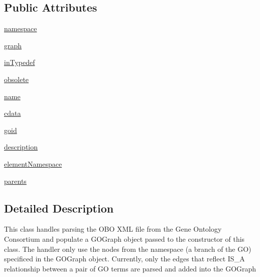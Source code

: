 \subsection*{Public Attributes}
\begin{DoxyCompactItemize}
\item 
\hyperlink{class_g_o_obo_xml_handler_1_1_g_o_obo_xml_handler_aecef11101379b72ea17282b417561bdf}{namespace}
\item 
\hyperlink{class_g_o_obo_xml_handler_1_1_g_o_obo_xml_handler_a44c8fab20dfbfe85307ab3bdc367cc99}{graph}
\item 
\hyperlink{class_g_o_obo_xml_handler_1_1_g_o_obo_xml_handler_a5c0eab36b7e0fb534bdbc22da5166b58}{inTypedef}
\item 
\hyperlink{class_g_o_obo_xml_handler_1_1_g_o_obo_xml_handler_aba8b9fba07d936ffc046b26fc1e10069}{obsolete}
\item 
\hyperlink{class_g_o_obo_xml_handler_1_1_g_o_obo_xml_handler_a7fc8050192b7fd5dd66ec525b9cbe962}{name}
\item 
\hyperlink{class_g_o_obo_xml_handler_1_1_g_o_obo_xml_handler_ae31e5a7b6388636e2dd341e0acc641c6}{cdata}
\item 
\hyperlink{class_g_o_obo_xml_handler_1_1_g_o_obo_xml_handler_ae3b360ff34e08ef35aee28e88bce8d88}{goid}
\item 
\hyperlink{class_g_o_obo_xml_handler_1_1_g_o_obo_xml_handler_adc00f0e38b911fd0116d5f0c4d236ad8}{description}
\item 
\hyperlink{class_g_o_obo_xml_handler_1_1_g_o_obo_xml_handler_a4efe9f1f6aed395111f5f570b34d3c95}{elementNamespace}
\item 
\hyperlink{class_g_o_obo_xml_handler_1_1_g_o_obo_xml_handler_aaa83347fe8143d86681f6ca65a7f8db2}{parents}
\end{DoxyCompactItemize}


\subsection{Detailed Description}
\begin{DoxyVerb}This class handles parsing the OBO XML file from the Gene Ontology Consortium and populate
    a GOGraph object passed to the constructor of this class.  The handler only use the nodes from
    the namespace (a branch of the GO) specificed in the GOGraph object.  Currently, only the edges
    that reflect IS_A relationship between a pair of GO terms are parsed and added into the GOGraph
\end{DoxyVerb}
 

